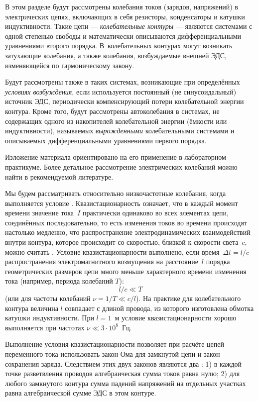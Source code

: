 В этом разделе будут рассмотрены колебания токов (зарядов, напряжений) 
в электрических цепях, включающих в себя резисторы, конденсаторы и катушки 
индуктивности. Такие цепи --- \emph{колебательные контуры} --- являются системами 
с одной степенью свободы и математически описываются дифференциальными 
уравнениями второго порядка. В~колебательных контурах могут возникать 
 затухающие колебания, а также  
колебания, возбуждаемые внешней ЭДС, изменяющейся по гармоническому закону.

Будут рассмотрены также  в таких системах, 
возникающие при определённых \emph{условиях возбуждения}, если используется 
постоянный (не синусоидальный) источник ЭДС, периодически компенсирующий 
потери колебательной энергии контура.
Кроме того, будут рассмотрены автоколебания в системах, не содержащих 
одного из накопителей колебательной энергии (ёмкости или индуктивности), 
называемых \emph{вырожденными} колебательными системами и описываемых 
дифференциальными уравнениями первого порядка.

Изложение материала ориентировано на его применение в лабораторном практикуме. 
Более детальное рассмотрение электрических колебаний можно найти
в рекомендуемой литературе.

Мы будем рассматривать относительно низкочастотные колебания, когда
выполняется условие . Квазистационарность означает, 
что в каждый момент времени значение тока~$I$ практически одинаково 
во всех элементах цепи, соединённых последовательно, то есть изменения токов 
во времени происходят настолько медленно, что распространение 
электродинамических взаимодействий внутри контура, которое происходит со скоростью, 
близкой к скорости света~$c$, можно считать . 
Условие квазистационарности выполнено, если
время~$\Delta t=l/c$ распространения электромагнитного возмущения 
на расстояние~$l$ порядка геометрических размеров цепи
много меньше характерного времени изменения тока 
(например, периода колебаний $T$):
\begin{equation*}
l/c\ll T
\end{equation*}
(или для частоты колебаний $\nu=1/T\ll c/l$). 
На практике для колебательного контура величина $l$ совпадает с длиной провода, 
из которого изготовлена обмотка катушки индуктивности. 
При $l=1$~м условие квазистационарности хорошо
выполняется при частотах $\nu\ll3\cdot10^8$~Гц.

Выполнение условия квазистационарности позволяет при расчёте цепей переменного
тока использовать закон Ома для замкнутой цепи и закон сохранения заряда. 
Следствием этих двух законов являются два :
1) в каждой точке разветвления проводов
алгебраическая сумма токов равна нулю; 2)
для любого замкнутого
контура сумма падений напряжений на отдельных участках равна алгебраической
сумме ЭДС в этом контуре.

